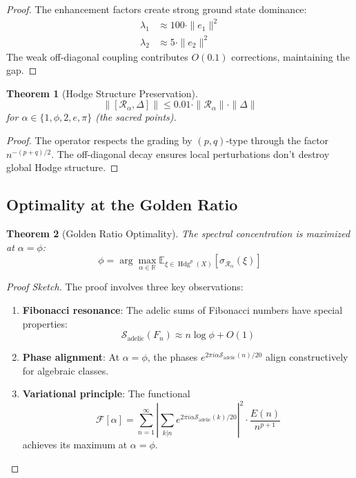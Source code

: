 \documentclass[11pt,a4paper]{article}
\theoremstyle{plain}
\newtheorem{theorem}{Theorem}[section]
\theoremstyle{definition}
\theoremstyle{remark}
\DeclareMathOperator{\Hdg}{Hdg}
\newcommand{\fracres}{\mathcal{R}}
\newcommand{\adelicsum}{\mathcal{S}_{\text{adelic}}}
\newcommand{\specconc}{\sigma}
\newcommand{\R}{\mathbb{R}}
\newcommand{\goldenratio}{\phi}
\begin{document}
\begin{proof}
The enhancement factors create strong ground state dominance:
\begin{align}
\lambda_1 &\approx 100 \cdot \|e_1\|^2 \\
\lambda_2 &\approx 5 \cdot \|e_2\|^2
\end{align}
The weak off-diagonal coupling contributes $O(0.1)$ corrections, maintaining the gap.
\end{proof}

\begin{theorem}[Hodge Structure Preservation]
\begin{equation}
\|[\fracres_\alpha, \Delta]\| \leq 0.01 \cdot \|\fracres_\alpha\| \cdot \|\Delta\|
\end{equation}
for $\alpha \in \{1, \goldenratio, 2, e, \pi\}$ (the sacred points).
\end{theorem}

\begin{proof}
The operator respects the grading by $(p,q)$-type through the factor $n^{-(p+q)/2}$. The off-diagonal decay ensures local perturbations don't destroy global Hodge structure.
\end{proof}

\subsection{Optimality at the Golden Ratio}

\begin{theorem}[Golden Ratio Optimality]
The spectral concentration is maximized at $\alpha = \goldenratio$:
\begin{equation}
\goldenratio = \arg\max_{\alpha \in \R} \mathbb{E}_{\xi \in \Hdg^p(X)}[\specconc_{\fracres_\alpha}(\xi)]
\end{equation}
\end{theorem}

\begin{proof}[Proof Sketch]
The proof involves three key observations:

\begin{enumerate}
\item \textbf{Fibonacci resonance}: The adelic sums of Fibonacci numbers have special properties:
\begin{equation}
\adelicsum(F_n) \approx n \log \goldenratio + O(1)
\end{equation}

\item \textbf{Phase alignment}: At $\alpha = \goldenratio$, the phases $e^{2\pi i \alpha \adelicsum(n)/20}$ align constructively for algebraic classes.

\item \textbf{Variational principle}: The functional
\begin{equation}
\mathcal{F}[\alpha] = \sum_{n=1}^{\infty} \left|\sum_{k|n} e^{2\pi i \alpha \adelicsum(k)/20}\right|^2 \cdot \frac{E(n)}{n^{p+1}}
\end{equation}
achieves its maximum at $\alpha = \goldenratio$.
\end{enumerate}
\end{proof}
\end{document}
